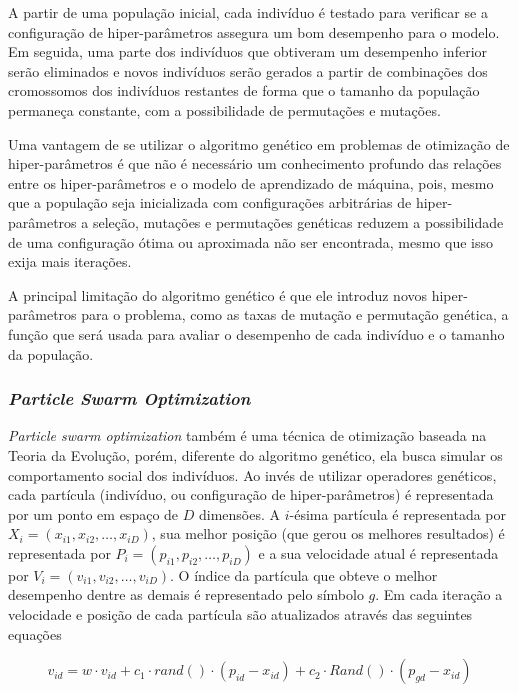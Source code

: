 A partir de uma população inicial, cada indivíduo é testado para verificar se a configuração de hiper-parâmetros assegura um bom desempenho para o modelo. Em seguida, uma parte dos indivíduos que obtiveram um desempenho inferior serão eliminados e novos indivíduos serão gerados a partir de combinações dos cromossomos dos indivíduos restantes de forma que o tamanho da população permaneça constante, com a possibilidade de permutações e mutações.

Uma vantagem de se utilizar o algoritmo genético em problemas de otimização de hiper-parâmetros é que não é necessário um conhecimento profundo das relações entre os hiper-parâmetros e o modelo de aprendizado de máquina, pois, mesmo que a população seja inicializada com configurações arbitrárias de hiper-parâmetros a seleção, mutações e permutações genéticas reduzem a possibilidade de uma configuração ótima ou aproximada não ser encontrada, mesmo que isso exija mais iterações.

A principal limitação do algoritmo genético é que ele introduz novos hiper-parâmetros para o problema, como as taxas de mutação e permutação genética, a função que será usada para avaliar o desempenho de cada indivíduo e o tamanho da população.

\subsubsection{\textit{Particle Swarm Optimization}}\label{particle_swarm_optimization}

\textit{Particle swarm optimization} \cite{parameter_selection_in_pso} também é uma técnica de otimização baseada na Teoria da Evolução, porém, diferente do algoritmo genético, ela busca simular os comportamento social dos indivíduos. Ao invés de utilizar operadores genéticos, cada partícula (indivíduo, ou configuração de hiper-parâmetros) é representada por um ponto em espaço de $D$ dimensões. A $i$-ésima partícula é representada por $X_{i} = (x_{i1}, x_{i2},\ldots,x_{iD})$, sua melhor posição (que gerou os melhores resultados) é representada por $P_{i} = (p_{i1}, p_{i2},\ldots,p_{iD})$ e a sua velocidade atual é representada por $V_{i} = (v_{i1}, v_{i2},\ldots,v_{iD})$. O índice da partícula que obteve o melhor desempenho dentre as demais é representado pelo símbolo $g$. Em cada iteração a velocidade e posição de cada partícula são atualizados através das seguintes equações

\begin{equation}\label{eq:pso_v}
    v_{id} = w \cdot v_{id} + c_{1} \cdot rand() \cdot (p_{id} - x_{id}) + c_{2} \cdot Rand() \cdot (p_{gd} - x_{id})
\end{equation}

